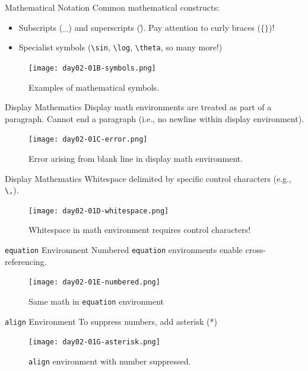 \documentclass{beamer}
\begin{document}
{  \begin{frame}{Mathematical Notation}
    Common mathematical constructs:
    \begin{itemize}
      \item Subscripts (\_) and superscripts (\^). Pay attention to curly braces ($\{\}$)!
      \item Specialist symbols (\texttt{\textbackslash sin}, \texttt{\textbackslash log}, \texttt{\textbackslash theta}, so many more!)
    \end{itemize}
    \begin{figure}
      \texttt{[image: day02-01B-symbols.png]}
      \caption{Examples of mathematical symbols.}
      \label{fig:day02-01B}
    \end{figure}
  \end{frame}

  \begin{frame}{Display Mathematics}
    Display math environments are treated as part of a paragraph. Cannot end a paragraph (i.e., no newline within display environment).
    \begin{figure}
      \texttt{[image: day02-01C-error.png]}
      \caption{Error arising from blank line in display math environment.}
      \label{fig:day02-01C}
    \end{figure}
  \end{frame}

  \begin{frame}{Display Mathematics}
    Whitespace delimited by specific control characters (e.g., \texttt{\textbackslash ,}).
    \begin{figure}
      \texttt{[image: day02-01D-whitespace.png]}
      \caption{Whitespace in math environment requires control characters!}
      \label{fig:day02-01D}
    \end{figure}
  \end{frame}

  \begin{frame}{\texttt{equation} Environment}
    Numbered \texttt{equation} environments enable cross-referencing.
    \begin{figure}
      \texttt{[image: day02-01E-numbered.png]}
      \caption{Same math in \texttt{equation} environment}
      \label{fig:day02-01E}
    \end{figure}
  \end{frame}

  \begin{frame}{\texttt{align} Environment}
    To suppress numbers, add asterisk (*) 
    \begin{figure}
      \texttt{[image: day02-01G-asterisk.png]}
      \caption{\texttt{align} environment with number suppressed.}
      \label{fig:day02-01G}
    \end{figure}
  \end{frame}

}
\end{document}
